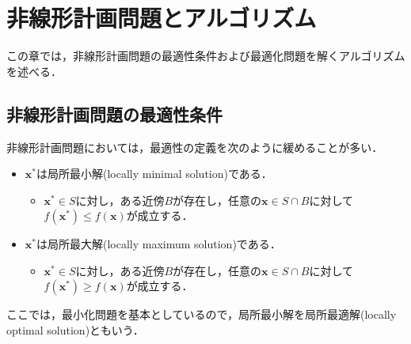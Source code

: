 \documentclass{jsreport}
\begin{document}
\chapter{非線形計画問題とアルゴリズム}
この章では，非線形計画問題の最適性条件および最適化問題を解くアルゴリズムを述べる．
\section{非線形計画問題の最適性条件}
非線形計画問題においては，最適性の定義を次のように緩めることが多い．
\begin{itemize}
  \item $\bm{x}^*$は局所最小解(locally minimal solution)である．
  \begin{itemize}
    \item $\bm{x}^* \in S$に対し，ある近傍$B$が存在し，任意の$\bm{x} \in S \cap B$に対して$f(\bm{x}^*) \leq f(\bm{x})$が成立する．
  \end{itemize}
  \item $\bm{x}^*$は局所最大解(locally maximum solution)である．
  \begin{itemize}
    \item $\bm{x}^* \in S$に対し，ある近傍$B$が存在し，任意の$\bm{x} \in S \cap B$に対して$f(\bm{x}^*) \geq f(\bm{x})$が成立する．
  \end{itemize}
\end{itemize}

ここでは，最小化問題を基本としているので，局所最小解を局所最適解(locally optimal solution)ともいう．
\end{document}
